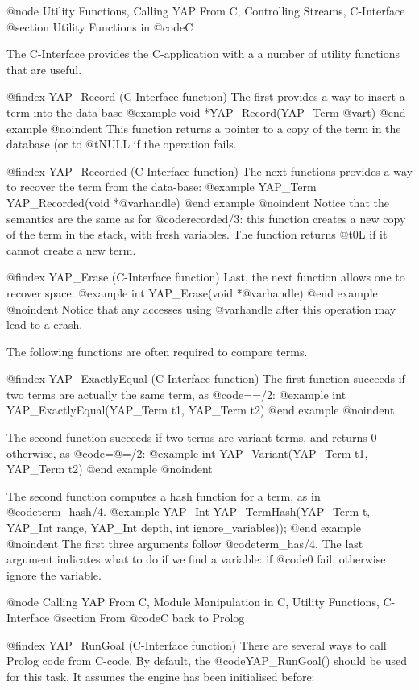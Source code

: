 {{{{{{{{{@node Utility Functions, Calling YAP From C, Controlling Streams, C-Interface
@section Utility Functions in @code{C}


The C-Interface  provides the C-application with a a number of utility
functions that are useful.


@findex YAP_Record (C-Interface function)
The first provides a way to insert a term into the data-base
@example
      void      *YAP_Record(YAP_Term @var{t})
@end example
@noindent
This function returns a pointer to a copy of the term in the database
(or to @t{NULL} if the operation fails.

@findex YAP_Recorded (C-Interface function)
The next functions provides a way to recover the term from the data-base:
@example
      YAP_Term      YAP_Recorded(void *@var{handle})
@end example
@noindent
Notice that the semantics are the same as for @code{recorded/3}: this
function creates a new copy of the term in the stack, with fresh
variables. The function returns @t{0L} if it cannot create a new term.

@findex YAP_Erase (C-Interface function)
Last, the next function allows one to recover space:
@example
      int      YAP_Erase(void *@var{handle})
@end example
@noindent
Notice that any accesses using @var{handle} after this operation may
lead to a crash.

The following functions are often required to compare terms.

@findex YAP_ExactlyEqual (C-Interface function)
The first function succeeds if two terms are actually the same term, as
@code{==/2}:
@example
      int      YAP_ExactlyEqual(YAP_Term t1, YAP_Term t2)
@end example
@noindent

The second function succeeds if two terms are variant terms, and returns
0 otherwise, as
@code{=@=/2}:
@example
      int      YAP_Variant(YAP_Term t1, YAP_Term t2)
@end example
@noindent

The second function computes a hash function for a term, as in
@code{term_hash/4}.
@example
     YAP_Int    YAP_TermHash(YAP_Term t, YAP_Int range, YAP_Int depth, int  ignore_variables));
@end example
@noindent
The first three arguments follow @code{term_has/4}. The last argument
indicates what to do if we find a variable: if @code{0} fail, otherwise
ignore the variable. 

@node Calling YAP From C, Module Manipulation in C, Utility Functions, C-Interface
@section From @code{C} back to Prolog

@findex YAP_RunGoal (C-Interface function)
There are several ways to call Prolog code from C-code. By default, the
@code{YAP_RunGoal()} should be used for this task. It assumes the engine
has been initialised before:

}}}}}}}}}
